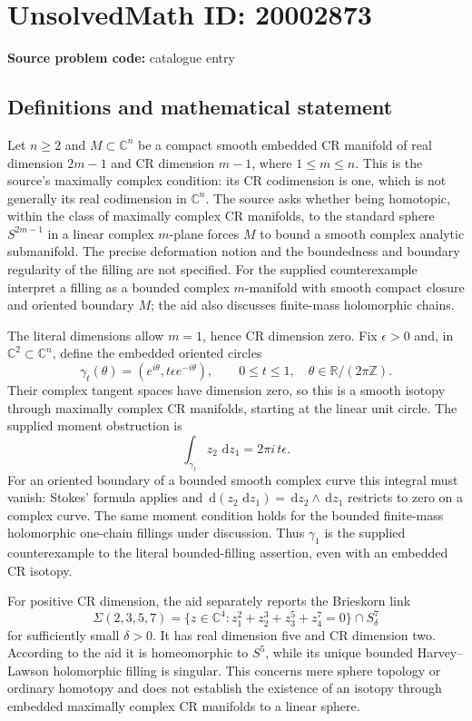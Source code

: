 \documentclass[11pt]{article}
\newcommand{\Z}{\mathbb{Z}}
\newcommand{\R}{\mathbb{R}}
\newcommand{\C}{\mathbb{C}}
\newcommand{\dd}{\,\mathrm{d}}
\begin{document}
\section*{UnsolvedMath ID: 20002873}
\textbf{Source problem code:} catalogue entry
\subsection{Definitions and mathematical statement}
Let $n\geq2$ and $M\subset\C^n$ be a compact smooth embedded CR manifold of real dimension $2m-1$ and CR dimension $m-1$, where $1\leq m\leq n$. This is the source's maximally complex condition: its CR codimension is one, which is not generally its real codimension in $\C^n$. The source asks whether being homotopic, within the class of maximally complex CR manifolds, to the standard sphere $S^{2m-1}$ in a linear complex $m$-plane forces $M$ to bound a smooth complex analytic submanifold. The precise deformation notion and the boundedness and boundary regularity of the filling are not specified. For the supplied counterexample interpret a filling as a bounded complex $m$-manifold with smooth compact closure and oriented boundary $M$; the aid also discusses finite-mass holomorphic chains.

The literal dimensions allow $m=1$, hence CR dimension zero. Fix $\epsilon>0$ and, in $\C^2\subset\C^n$, define the embedded oriented circles
\[
\gamma_t(\theta)=(e^{i\theta},t\epsilon e^{-i\theta}),\qquad
0\leq t\leq1,\quad\theta\in\R/(2\pi\Z).
\]
Their complex tangent spaces have dimension zero, so this is a smooth isotopy through maximally complex CR manifolds, starting at the linear unit circle. The supplied moment obstruction is
\[
\int_{\gamma_t}z_2\,\dd z_1=2\pi i\,t\epsilon.
\]
For an oriented boundary of a bounded smooth complex curve this integral must vanish: Stokes' formula applies and $\dd(z_2\,\dd z_1)=\dd z_2\wedge\dd z_1$ restricts to zero on a complex curve. The same moment condition holds for the bounded finite-mass holomorphic one-chain fillings under discussion. Thus $\gamma_1$ is the supplied counterexample to the literal bounded-filling assertion, even with an embedded CR isotopy.

For positive CR dimension, the aid separately reports the Brieskorn link
\[
\Sigma(2,3,5,7)=\{z\in\C^4:z_1^2+z_2^3+z_3^5+z_4^7=0\}\cap S^7_\delta
\]
for sufficiently small $\delta>0$. It has real dimension five and CR dimension two. According to the aid it is homeomorphic to $S^5$, while its unique bounded Harvey--Lawson holomorphic filling is singular. This concerns mere sphere topology or ordinary homotopy and does not establish the existence of an isotopy through embedded maximally complex CR manifolds to a linear sphere.
\end{document}
